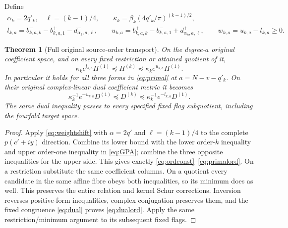\documentclass[11pt,a4paper]{article}
\newtheorem{theorem}{Theorem}[section]
\begin{document}
Define
\begin{equation}
\begin{gathered}
 \alpha_k=2q'_k,\quad \ell=(k-1)/4,\qquad
 \kappa_k=\beta_k(4q'_k/\pi)^{(k-1)/2},\\
 l_{k,a}=b^-_{k,a,k}-b^+_{k,a,1}-d^-_{\alpha_k,a,\ell},\qquad
 u_{k,a}=b^+_{k,a,k}-b^-_{k,a,1}+d^+_{\alpha_k,a,\ell},\qquad
 w_{k,a}=u_{k,a}-l_{k,a}\ge0.
\end{gathered}\label{eq:ordconst}
\end{equation}
\begin{theorem}[Full original source-order transport]\label{thm:full}
On the degree-$a$ original coefficient space, and on every fixed restriction or attained quotient of it,
\begin{equation}
 \kappa_k e^{l_{k,a}}H^{(1)}\preceq H^{(k)}
                 \preceq\kappa_k e^{u_{k,a}}H^{(1)}.
 \label{eq:primalord}
\end{equation}
In particular it holds for all three forms in \eqref{eq:primal} at $a=N-v-q'_k$. On their original complex-linear dual coefficient metric it becomes
\begin{equation}
 \kappa_k^{-1}e^{-u_{k,a}}D^{(1)}\preceq D^{(k)}
                 \preceq\kappa_k^{-1}e^{-l_{k,a}}D^{(1)}.
 \label{eq:dualord}
\end{equation}
The same dual inequality passes to every specified fixed flag subquotient, including the fourfold target space.
\end{theorem}
\begin{proof}
Apply \eqref{eq:weightshift} with $\alpha=2q'$ and $\ell=(k-1)/4$ to the complete $p(c'+iy)$ direction. Combine its lower bound with the lower order-$k$ inequality and upper order-one inequality in \eqref{eq:GPA}; combine the three opposite inequalities for the upper side. This gives exactly \eqref{eq:ordconst}--\eqref{eq:primalord}. On a restriction substitute the same coefficient columns. On a quotient every candidate in the same affine fibre obeys both inequalities, so its minimum does as well. This preserves the entire relation and kernel Schur corrections. Inversion reverses positive-form inequalities, complex conjugation preserves them, and the fixed congruence \eqref{eq:dual} proves \eqref{eq:dualord}. Apply the same restriction/minimum argument to its subsequent fixed flags.
\end{proof}
\end{document}
